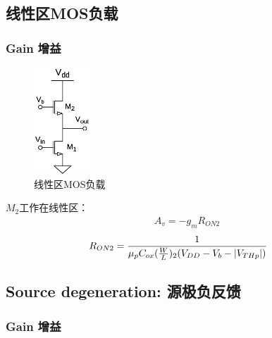 \documentclass[twoside,a4paper,openright,titlepage,draft]{ctexrep}
\begin{document}
\subsection{线性区MOS负载\\}
\subsubsection{Gain 增益}

\begin{figure}
    \centering
    \includegraphics[height=40mm]{currentsourceload.eps}
    \caption{线性区MOS负载}
    \label{fig:线性区MOS负载}
\end{figure}
$M_2$工作在线性区：
\begin{align}
    &A_v = -g_mR_{ON2}
\end{align}
\begin{align}
    &R_{ON2} = \frac{1}{\mu_pC_{ox}(\frac{W}{L})_2(V_{DD} - V_b - \left|V_{THp}\right|)} \notag
\end{align}

\newpage
\subsection{Source degeneration: 源极负反馈\\}
\subsubsection{Gain 增益}
\end{document}
